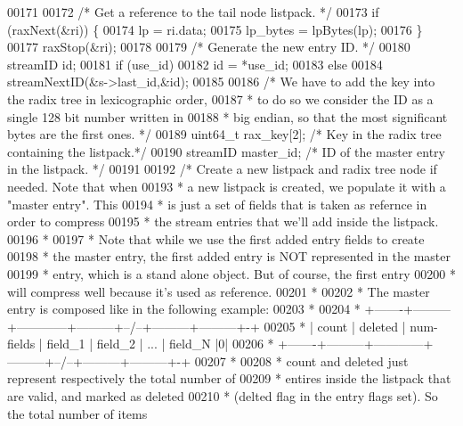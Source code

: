 \begin{DoxyCode}
{00171 
00172     \textcolor{comment}{/* Get a reference to the tail node listpack. */}
00173     \textcolor{keywordflow}{if} (raxNext(&ri)) \{
00174         lp = ri.data;
00175         lp\_bytes = lpBytes(lp);
00176     \}
00177     raxStop(&ri);
00178 
00179     \textcolor{comment}{/* Generate the new entry ID. */}
00180     streamID id;
00181     \textcolor{keywordflow}{if} (use\_id)
00182         id = *use\_id;
00183     \textcolor{keywordflow}{else}
00184         streamNextID(&s->last\_id,&id);
00185 
00186     \textcolor{comment}{/* We have to add the key into the radix tree in lexicographic order,}
00187 \textcolor{comment}{     * to do so we consider the ID as a single 128 bit number written in}
00188 \textcolor{comment}{     * big endian, so that the most significant bytes are the first ones. */}
00189     uint64\_t rax\_key[2];    \textcolor{comment}{/* Key in the radix tree containing the listpack.*/}
00190     streamID master\_id;     \textcolor{comment}{/* ID of the master entry in the listpack. */}
00191 
00192     \textcolor{comment}{/* Create a new listpack and radix tree node if needed. Note that when}
00193 \textcolor{comment}{     * a new listpack is created, we populate it with a "master entry". This}
00194 \textcolor{comment}{     * is just a set of fields that is taken as refernce in order to compress}
00195 \textcolor{comment}{     * the stream entries that we'll add inside the listpack.}
00196 \textcolor{comment}{     *}
00197 \textcolor{comment}{     * Note that while we use the first added entry fields to create}
00198 \textcolor{comment}{     * the master entry, the first added entry is NOT represented in the master}
00199 \textcolor{comment}{     * entry, which is a stand alone object. But of course, the first entry}
00200 \textcolor{comment}{     * will compress well because it's used as reference.}
00201 \textcolor{comment}{     *}
00202 \textcolor{comment}{     * The master entry is composed like in the following example:}
00203 \textcolor{comment}{     *}
00204 \textcolor{comment}{     * +-------+---------+------------+---------+--/--+---------+---------+-+}
00205 \textcolor{comment}{     * | count | deleted | num-fields | field\_1 | field\_2 | ... | field\_N |0|}
00206 \textcolor{comment}{     * +-------+---------+------------+---------+--/--+---------+---------+-+}
00207 \textcolor{comment}{     *}
00208 \textcolor{comment}{     * count and deleted just represent respectively the total number of}
00209 \textcolor{comment}{     * entires inside the listpack that are valid, and marked as deleted}
00210 \textcolor{comment}{     * (delted flag in the entry flags set). So the total number of items}
}
\end{DoxyCode}
